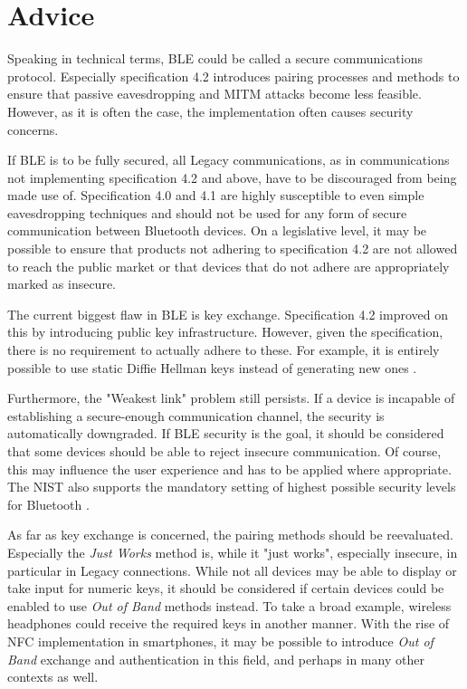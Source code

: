 \section{Advice}

Speaking in technical terms, \ac{BLE} could be called a secure communications protocol. Especially specification 4.2 introduces pairing processes and methods to ensure that passive eavesdropping and MITM attacks become less feasible. However, as it is often the case, the implementation often causes security concerns.

If \ac{BLE} is to be fully secured, all Legacy communications, as in communications not implementing specification 4.2 and above, have to be discouraged from being made use of. Specification 4.0 and 4.1 are highly susceptible to even simple eavesdropping techniques and should not be used for any form of secure communication between Bluetooth devices. On a legislative level, it may be possible to ensure that products not adhering to specification 4.2 are not allowed to reach the public market or that devices that do not adhere are appropriately marked as insecure.

The current biggest flaw in \ac{BLE} is key exchange. Specification 4.2 improved on this by introducing public key infrastructure. However, given the specification, there is no requirement to actually adhere to these. For example, it is entirely possible to use static Diffie Hellman keys instead of generating new ones \cite{return-false}.

Furthermore, the "Weakest link" problem still persists. If a device is incapable of establishing a secure-enough communication channel, the security is automatically downgraded. If \ac{BLE} security is the goal, it should be considered that some devices should be able to reject insecure communication. Of course, this may influence the user experience and has to be applied where appropriate. The NIST also supports the mandatory setting of highest possible security levels for Bluetooth \cite{nist}.

As far as key exchange is concerned, the pairing methods should be reevaluated. Especially the \textit{Just Works} method is, while it "just works", especially insecure, in particular in Legacy connections. While not all devices may be able to display or take input for numeric keys, it should be considered if certain devices could be enabled to use \textit{Out of Band} methods instead. To take a broad example, wireless headphones could receive the required keys in another manner. With the rise of \ac{NFC} implementation in smartphones, it may be possible to introduce \textit{Out of Band} exchange and authentication in this field, and perhaps in many other contexts as well.

